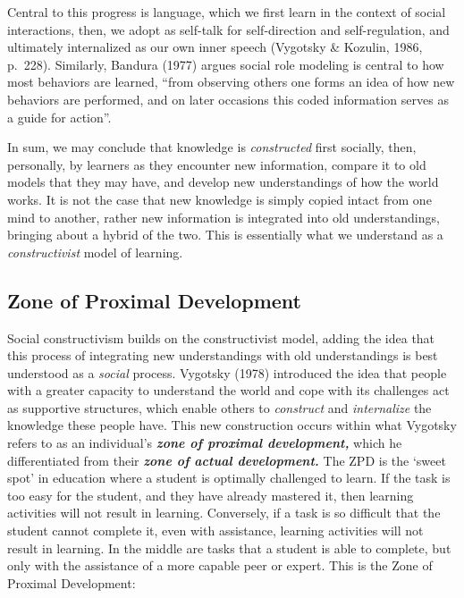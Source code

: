 \documentclass[
]{book}
\begin{document}
Central to this progress is language, which we first learn in the context of social interactions, then, we adopt as self-talk for self-direction and self-regulation, and ultimately internalized as our own inner speech (Vygotsky \& Kozulin, 1986, p.~228). Similarly, Bandura (1977) argues social role modeling is central to how most behaviors are learned, ``from observing others one forms an idea of how new behaviors are performed, and on later occasions this coded information serves as a guide for action''.

In sum, we may conclude that knowledge is \emph{constructed} first socially, then, personally, by learners as they encounter new information, compare it to old models that they may have, and develop new understandings of how the world works. It is not the case that new knowledge is simply copied intact from one mind to another, rather new information is integrated into old understandings, bringing about a hybrid of the two. This is essentially what we understand as a \emph{constructivist} model of learning.

\hypertarget{zone-of-proximal-development}{%
\subsection*{Zone of Proximal Development}\label{zone-of-proximal-development}}

Social constructivism builds on the constructivist model, adding the idea that this process of integrating new understandings with old understandings is best understood as a \emph{social} process. Vygotsky (1978) introduced the idea that people with a greater capacity to understand the world and cope with its challenges act as supportive structures, which enable others to \emph{construct} and \emph{internalize} the knowledge these people have. This new construction occurs within what Vygotsky refers to as an individual's \textbf{\emph{zone of proximal development,}} which he differentiated from their \textbf{\emph{zone of actual development.}} The ZPD is the `sweet spot' in education where a student is optimally challenged to learn. If the task is too easy for the student, and they have already mastered it, then learning activities will not result in learning. Conversely, if a task is so difficult that the student cannot complete it, even with assistance, learning activities will not result in learning. In the middle are tasks that a student is able to complete, but only with the assistance of a more capable peer or expert. This is the Zone of Proximal Development:
\end{document}

